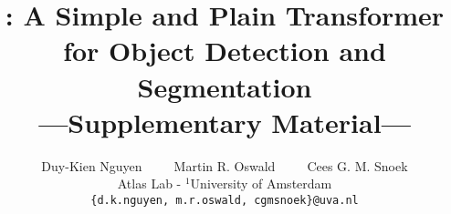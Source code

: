 \documentclass[10pt,twocolumn,letterpaper]{article}
\title{\ours: A Simple and Plain Transformer for Object Detection and Segmentation\\{---Supplementary Material---}}
\author{Duy-Kien Nguyen~~~~~Martin R. Oswald~~~~~Cees G. M. Snoek \\
{\normalsize Atlas Lab - $^1$University of Amsterdam}\\
{\tt\small \{d.k.nguyen, m.r.oswald, cgmsnoek\}@uva.nl}
}
\begin{document}
\maketitle



\tableofcontents

\appendix



% 
% 
% 

{
    \small
    
    
}

% 
\end{document}
